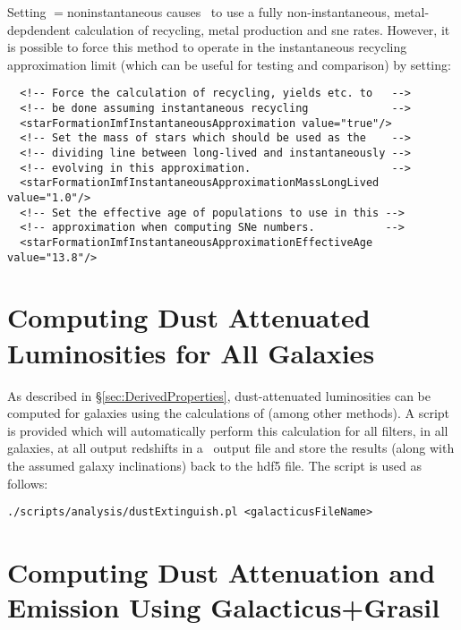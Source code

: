 Setting {\normalfont \ttfamily [stellarPopulationPropertiesMethod]}$=${\normalfont \ttfamily noninstantaneous} causes \glc\ to use a fully non-instantaneous, metal-depdendent calculation of recycling, metal production and \gls{sne} rates. However, it is possible to force this method to operate in the instantaneous recycling approximation limit (which can be useful for testing and comparison) by setting:
\begin{verbatim}
  <!-- Force the calculation of recycling, yields etc. to   -->
  <!-- be done assuming instantaneous recycling             -->
  <starFormationImfInstantaneousApproximation value="true"/>
  <!-- Set the mass of stars which should be used as the    -->
  <!-- dividing line between long-lived and instantaneously -->
  <!-- evolving in this approximation.                      -->
  <starFormationImfInstantaneousApproximationMassLongLived value="1.0"/>
  <!-- Set the effective age of populations to use in this -->
  <!-- approximation when computing SNe numbers.           -->
  <starFormationImfInstantaneousApproximationEffectiveAge value="13.8"/>
\end{verbatim}

\section{Computing Dust Attenuated Luminosities for All Galaxies}\label{sec:TutorialDustAttenuation}

As described in \S\ref{sec:DerivedProperties}, dust-attenuated luminosities can be computed for galaxies using the calculations of \cite{ferrara_atlas_1999} (among other methods). A script is provided which will automatically perform this calculation for all filters, in all galaxies, at all output redshifts in a \glc\ output file and store the results (along with the assumed galaxy inclinations) back to the \gls{hdf5} file. The script is used as follows:
\begin{verbatim}
./scripts/analysis/dustExtinguish.pl <galacticusFileName>
\end{verbatim}

\section{Computing Dust Attenuation and Emission Using Galacticus+Grasil}\label{sec:TutorialGrasil}

